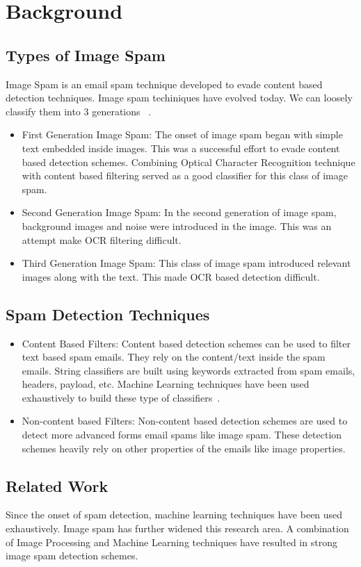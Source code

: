 \chapter{Background}

\section{Types of Image Spam}
Image Spam is an email spam technique developed to evade content based detection techniques. Image spam techiniques have evolved today. We can loosely classify them into 3 generations ~\cite{7}. 
\begin{itemize}
	\item First Generation Image Spam: The onset of image spam began with simple text embedded inside images. This was a successful effort to evade content based detection schemes. Combining Optical Character Recognition technique with content based filtering served as a good classifier for this class of image spam.
	\item Second Generation Image Spam: In the second generation of image spam, background images and noise were introduced in the image. This was an attempt make OCR filtering difficult. 
	\item Third Generation Image Spam: This class of image spam introduced relevant images along with the text. This made OCR based detection difficult.  
\end{itemize}

\section{Spam Detection Techniques}
\begin{itemize}
	\item Content Based Filters: Content based detection schemes can be used to filter text based spam emails. They rely on the content/text inside the spam emails. String classifiers are built using keywords extracted from spam emails, headers, payload, etc. Machine Learning techniques have been used exhaustively to build these type of classifiers~\cite{1}.
	\item Non-content based Filters: Non-content based detection schemes are used to detect more advanced forms email spams like image spam. These detection schemes heavily rely on other properties of the emails like image properties. 
\end{itemize}


\section{Related Work}
Since the onset of spam detection, machine learning techniques have been used exhaustively. Image spam has further widened this research area. A combination of Image Processing and Machine Learning techniques have resulted in strong image spam detection schemes. 

